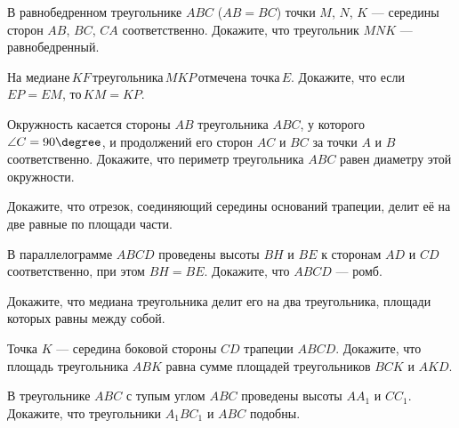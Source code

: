 \begin{class}[number=7]
	\begin{listofex}
		\item В равнобедренном треугольнике \( ABC \) (\( AB=BC \)) точки \( M \), \( N \), \( K \) --- середины сторон \( AB \), \( BC \), \( CA \) соответственно. Докажите, что треугольник \( MNK \) --- равнобедренный.
		\item На медиане \( KF \) треугольника \( MKP \) отмечена точка \( E \). Докажите, что если \( EP=EM \), то \( KM=KP \).
		\item Окружность касается стороны \( AB \) треугольника \( ABC \), у которого \( \angle C=90\degree \), и продолжений его сторон \( AC \) и \( BC \) за точки \( A \) и \( B \) соответственно. Докажите, что периметр треугольника \( ABC \) равен диаметру этой окружности.
		\item Докажите, что отрезок, соединяющий середины оснований трапеции, делит её на две равные по площади части.
		\item В параллелограмме \( ABCD \) проведены высоты \( BH \) и \( BE \) к сторонам \( AD \) и \( CD \) соответственно, при этом \( BH=BE \). Докажите, что \( ABCD \) --- ромб.
		\item Докажите, что медиана треугольника делит его на два треугольника, площади которых равны между собой.
		\item Точка \( K \) --- середина боковой стороны \( CD \) трапеции \( ABCD \). Докажите, что площадь треугольника \( ABK \) равна сумме площадей треугольников \( BCK \) и \( AKD \).
		\item В треугольнике \( ABC \) с тупым углом \( ABC \) проведены высоты \( AA_1 \) и \( CC_1 \). Докажите, что треугольники \( A_1BC_1 \) и \( ABC \) подобны.
	\end{listofex}
\end{class}

